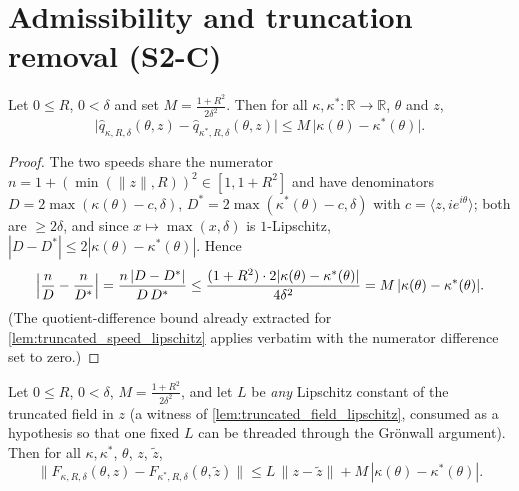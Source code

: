 \section{Admissibility and truncation removal (S2-C)}
\label{sec:sphere_admissible}

\begin{lemma}
  \label{lem:truncated_speed_sub_le}
  Let $0\le R$, $0<\delta$ and set $M=\tfrac{1+R^2}{2\delta^2}$. Then for all
  $\kappa,\kappa^\ast:\mathbb R\to\mathbb R$, $\theta$ and $z$,
  \[
    \bigl|\hat q_{\kappa,R,\delta}(\theta,z)-\hat q_{\kappa^\ast,R,\delta}(\theta,z)\bigr|
    \le M\,\bigl|\kappa(\theta)-\kappa^\ast(\theta)\bigr| .
  \]
\end{lemma}

\begin{proof}

\leanok
  The two speeds share the numerator $n=1+(\min(\|z\|,R))^2\in[1,1+R^2]$ and have
  denominators $D=2\max(\kappa(\theta)-c,\delta)$, $D^\ast=2\max(\kappa^\ast(\theta)-c,
  \delta)$ with $c=\langle z,ie^{i\theta}\rangle$; both are $\ge2\delta$, and since
  $x\mapsto\max(x,\delta)$ is $1$-Lipschitz, $|D-D^\ast|\le2|\kappa(\theta)-
  \kappa^\ast(\theta)|$. Hence
  \[
    \Bigl|\frac nD-\frac n{D^\ast}\Bigr|
    =\frac{n\,|D-D^\ast|}{D\,D^\ast}
    \le\frac{(1+R^2)\cdot2|\kappa(\theta)-\kappa^\ast(\theta)|}{4\delta^2}
    =M\,|\kappa(\theta)-\kappa^\ast(\theta)| .
  \]
  (The quotient-difference bound already extracted for
  \cref{lem:truncated_speed_lipschitz} applies verbatim with the numerator difference
  set to zero.)
\end{proof}

\begin{lemma}
  \label{lem:truncated_field_sub_le}
  Let $0\le R$, $0<\delta$, $M=\tfrac{1+R^2}{2\delta^2}$, and let $L$ be \emph{any}
  Lipschitz constant of the truncated field in $z$ (a witness of
  \cref{lem:truncated_field_lipschitz}, consumed as a hypothesis so that one fixed $L$
  can be threaded through the Gr\"onwall argument). Then for all $\kappa,\kappa^\ast$,
  $\theta$, $z$, $\tilde z$,
  \[
    \|F_{\kappa,R,\delta}(\theta,z)-F_{\kappa^\ast,R,\delta}(\theta,\tilde z)\|
    \le L\,\|z-\tilde z\|+M\,|\kappa(\theta)-\kappa^\ast(\theta)| .
  \]
\end{lemma}

